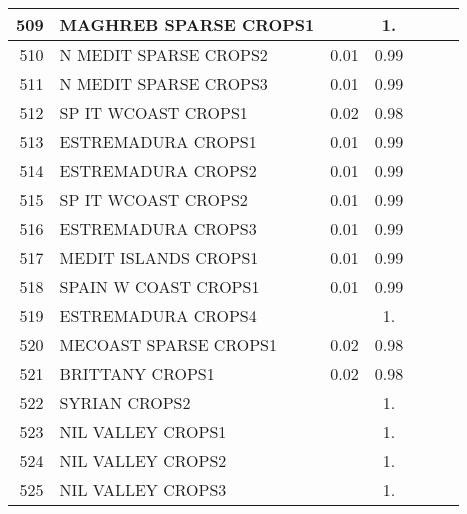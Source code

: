 {{\begin{tabular}{||r|l||c|c|c|c|c||}
 \hline
         509  & MAGHREB SPARSE CROPS1                                        &       &  1.   &       &       \\
 \hline
         510  & N MEDIT SPARSE CROPS2                                        &  0.01 &  0.99 &       &       \\
 \hline
         511  & N MEDIT SPARSE CROPS3                                        &  0.01 &  0.99 &       &       \\
 \hline
         512  & SP IT WCOAST CROPS1                                          &  0.02 &  0.98 &       &       \\
 \hline
         513  & ESTREMADURA CROPS1                                           &  0.01 &  0.99 &       &       \\
 \hline
         514  & ESTREMADURA CROPS2                                           &  0.01 &  0.99 &       &       \\
 \hline
         515  & SP IT WCOAST CROPS2                                          &  0.01 &  0.99 &       &       \\
 \hline
         516  & ESTREMADURA CROPS3                                           &  0.01 &  0.99 &       &       \\
 \hline
         517  & MEDIT ISLANDS CROPS1                                         &  0.01 &  0.99 &       &       \\
 \hline
         518  & SPAIN W COAST CROPS1                                         &  0.01 &  0.99 &       &       \\
 \hline
         519  & ESTREMADURA CROPS4                                           &       &  1.   &       &       \\
 \hline
         520  & MECOAST SPARSE CROPS1                                        &  0.02 &  0.98 &       &       \\
 \hline
         521  & BRITTANY CROPS1                                              &  0.02 &  0.98 &       &       \\
 \hline
         522  & SYRIAN CROPS2                                                &       &  1.   &       &       \\
 \hline
         523  & NIL VALLEY CROPS1                                            &       &  1.   &       &       \\
 \hline
         524  & NIL VALLEY CROPS2                                            &       &  1.   &       &       \\
 \hline
         525  & NIL VALLEY CROPS3                                            &       &  1.   &       &       \\

\end{tabular}}}
